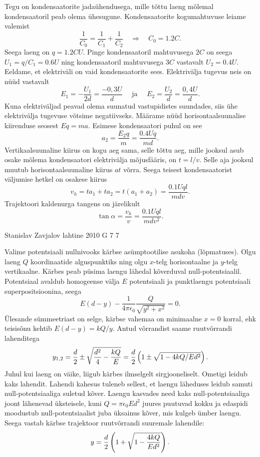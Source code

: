 \documentclass[11pt]{article}
\begin{document}
{{\ifSolution
Tegu on kondensaatorite jadaühendusega, mille tõttu laeng mõlemal kondensaatoril peab olema ühesugune. Kondensaatorite kogumahtuvuse leiame valemist 
\[
\frac{1}{C_{0}}=\frac{1}{C_{1}}+\frac{1}{C_{2}} \quad \Rightarrow \quad C_{0}=\num{1,2} C.
\]
Seega laeng on $q = \num{1,2}CU$. Pinge kondensaatoril mahtuvusega $2C$ on seega $U_1 = q/C_1 = \num{0,6}U$ ning kondensaatoril mahtuvusega $3C$ vastavalt $U_2 = \num{0,4}U$. Eeldame, et elektriväli on vaid kondensaatorite sees. Elektrivälja tugevus neis on nüüd vastavalt
\[
E_{1}=-\frac{U_{1}}{2 d}=\frac{-0,3 U}{d} \quad \text { ja } \quad E_{2}=\frac{U_{2}}{d}=\frac{0,4 U}{d}.
\]
Kuna elektriväljad peavad olema suunatud vastupidistes suundades, siis ühe elektrivälja tugevuse võtsime negatiivseks. Määrame nüüd horisontaalsuunalise kiirenduse seosest $Eq = ma$. Esimese kondensaatori puhul on see
\[
a_{2}=\frac{E_{2} q}{m}=\frac{\num{0,4} U q}{m d}.
\]
Vertikaalsuunaline kiirus on kogu aeg sama, selle tõttu aeg, mille jooksul asub osake mõlema kondensaatori elektrivälja mõjusfääris, on $t = l/v$. Selle aja jooksul muutub horisontaalsuunaline kiirus $at$ võrra. Seega teisest kondensaatorist väljumise hetkel on osakese kiirus
\[
v_{h}=t a_{1}+t a_{2}=t\left(a_{1}+a_{2}\right)=\frac{\num{0,1} U q l}{m d v}.
\]
Trajektoori kaldenurga tangens on järelikult
\[
\tan \alpha = \frac{v_h}{v} = \frac{\num{0,1}Uql}{mdv^2}.
\]
\fi
}

{Stanislav Zavjalov} %
{lahtine} %
{2010} %
{G 7} %
{7} %
{

\ifSolution
Valime potentsiaali nullnivooks kärbse asümptootilise asukoha (lõpmatuses). 
Olgu laeng $Q$ koordinaatide alguspunktiks ning olgu $x$-telg horisontaalne ja $y$-telg vertikaalne. 
Kärbes peab püsima laengu lähedal kõverduval null-potentsiaalil. 
Potentsiaal avaldub homogeense välja $E$ potentsiaali ja punktlaengu potentsiaali superpositsioonina, seega 
\[
E(d - y) - \frac{1}{4\pi\epsilon_0}\frac{Q}{\sqrt{y^2 + x^2}} = 0.
\]
Ülesande sümmeetriast on selge, kärbse vahemaa on minimaalne $x=0$ korral, ehk teisisõnu kehtib $E(d-y) = kQ/y$. Antud võrrandist saame ruutvõrrandi lahenditega
\[
y_{1,2} = {d \over 2} \pm \sqrt{\frac {d^2}4 - {kQ \over E}} = {d \over 2}\left( 1 \pm \sqrt{1 - 4kQ / Ed^2}\right).
\] 
Juhul kui laeng on väike, liigub kärbes ilmselgelt sirgjooneliselt. Ometigi leidub kaks lahendit. Lahendi kahesus tuleneb sellest, et laengu läheduses leidub samuti
null-potentsiaaliga suletud kõver. Laengu kasvades need kaks null-potentsiaaliga joont lähenevad üksteisele, kuni $Q=\pi\epsilon_0Ed^2$ juures 
puutuvad kokku ja edaspidi moodustub null-potentsiaalist juba üksainus kõver, mis kulgeb ümber laengu. 
Seega vastab kärbse trajektoor ruutvõrrandi suuremale lahendile:
$$y= {d \over 2}\left(1 + \sqrt{1 - {4kQ \over Ed^2}}\right).$$ 
\fi
}

}
\end{document}
